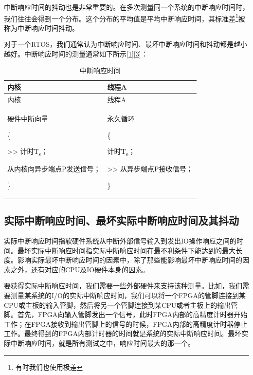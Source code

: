 中断响应时间的抖动也是非常重要的。在多次测量同一个系统的中断响应时间时，我们往往会得到一个分布。这个分布的平均值是平均中断响应时间，其标准差\footnote{有时我们也使用极差}被称为中断响应时间抖动。

对于一个RTOS，我们通常认为中断响应时间、最坏中断响应时间和抖动都是越小越好。中断响应时间的测量通常如下所示\hyperref[cite:1-1]{{[}1{]}}\hyperref[cite:1-3]{{[}3{]}}：

\begin{xltabular}{\textwidth}{@{}>{\hsize\raggedright\arraybackslash}X>{\hsize\raggedright\arraybackslash}X@{}}
\caption{中断响应时间}\label{tab:1-12-interrupt-response-time}\\
\toprule
内核 & 线程A\tabularnewline
\endfirsthead
\toprule
内核 & 线程A\tabularnewline
\midrule
\endhead
\bottomrule
\endlastfoot
硬件中断向量

\{

\textgreater\textgreater{} 计时T\textsubscript{s}；

从内核向异步端点P发送信号；

\}\strut
 & 永久循环

\{

计时T\textsubscript{e}；

\textgreater\textgreater{} 从异步端点P接收信号；

\}\strut
\tabularnewline
\end{xltabular}

\subsection{实际中断响应时间、最坏实际中断响应时间及其抖动}\label{subsec:1-actual-interrupt-response-time-and-jitter}

实际中断响应时间指软硬件系统从中断外部信号输入到发出IO操作响应之间的时间。最坏实际中断响应时间指实际中断响应时间在最不利条件下能达到的最大长度。影响实际最坏中断响应时间的因素中，除了那些能影响最坏中断响应时间的因素之外，还有对应的CPU及IO硬件本身的因素。

要获得实际中断响应时间，我们需要一些外部硬件来支持该种测量。比如，我们需要测量某系统的I/O的实际中断响应时间，我们可以将一个FPGA的管脚连接到某CPU或主板的输入管脚，然后将另一个管脚连接到某CPU或者主板上的输出管脚。首先，FPGA向输入管脚发出一个信号，此时FPGA内部的高精度计时器开始工作；在FPGA接收到输出管脚上的信号的时候，FPGA内部的高精度计时器停止工作。最终得到的FPGA内部计时器的时间就是系统的实际中断响应时间。最坏实际中断响应时间，就是所有测试之中，响应时间最大的那一个。

